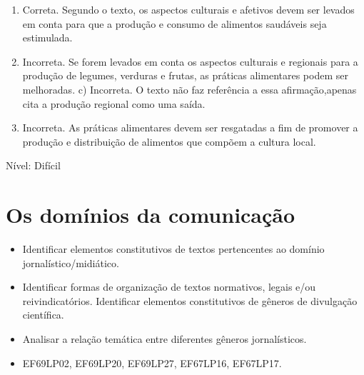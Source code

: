 {\begin{enumerate}
\def\labelenumi{\arabic{enumi}.}
\item
  Correta. Segundo o texto, os aspectos culturais e afetivos devem ser
  levados em conta para que a produção e consumo de alimentos saudáveis
  seja estimulada.
\item
  Incorreta. Se forem levados em conta os aspectos culturais e regionais
  para a produção de legumes, verduras e frutas, as práticas alimentares
  podem ser melhoradas. c) Incorreta. O texto não faz referência a essa
  afirmação,apenas cita a produção regional como uma saída.
\item
  Incorreta. As práticas alimentares devem ser resgatadas a fim de
  promover a produção e distribuição de alimentos que compõem a cultura
  local.
\end{enumerate}

Nível: Difícil

\chapter{Os domínios da comunicação}


\begin{itemize}

  \item Identificar elementos constitutivos de textos pertencentes ao
domínio jornalístico/midiático.

  \item Identificar formas de organização de textos normativos, legais e/ou
reivindicatórios. Identificar elementos constitutivos de gêneros de
divulgação científica.

  \item Analisar a relação temática entre diferentes gêneros jornalísticos.

\end{itemize}


\begin{itemize}
  
  \item EF69LP02, EF69LP20, EF69LP27, EF67LP16, EF67LP17.

\end{itemize}

}
